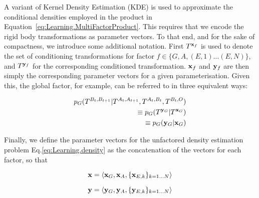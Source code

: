 A variant of Kernel Density Estimation (KDE) \citep{scott2004multi-dimensional} is used to approximate the conditional densities employed in the product in Equation~\eqref{eq:Learning.MultiFactorProduct}. This requires that we encode the rigid body transformations as parameter vectors. To that end, and for the sake of compactness, we introduce some additional notation. First $T^{\mathbf{x}_f}$ is used to denote the set of conditioning transformations for factor $f \in \{G, A, (E,1) \ldots (E,N)\}$, and $T^{\mathbf{y}_f}$ for the corresponding conditioned transformation. $\mathbf{x}_f$ and $\mathbf{y}_f$ are then simply the corresponding parameter vectors for a given parameterisation. Given this, the global factor, for example, can be referred to in three equivalent ways:

\begin{eqnarray}
p_G(T^{B_{t}, B_{t+1}}|T^{A_{t}, A_{t+1}}, T^{A_t, B_t}, T^{B_t, O}) \\ \equiv p_G(T^{\mathbf{y}_G}|T^{\mathbf{x}_G})  \\
\equiv p_G(\mathbf{y}_G|\mathbf{x}_G)
\end{eqnarray}

Finally, we define the parameter vectors for the unfactored density estimation problem Eq.\eqref{eq:Learning.density} as the concatenation of the vectors for each factor, so that

\begin{equation}
\mathbf{x}= \langle \mathbf{x}_G, \mathbf{x}_A, \{\mathbf{x}_{E,k}\}_{k = 1 \ldots N} \rangle
\end{equation}

\begin{equation}
\mathbf{y} = \langle \mathbf{y}_G, \mathbf{y}_A, \{\mathbf{y}_{E,k}\}_{k = 1 \ldots N} \rangle
\end{equation}

